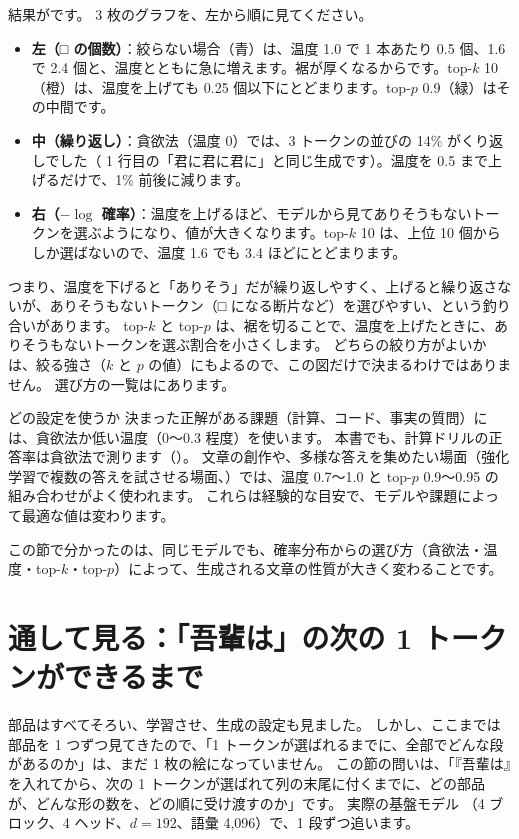 結果がです。
3 枚のグラフを、左から順に見てください。
\begin{itemize}
\item \textbf{左（□ の個数）}：絞らない場合（青）は、温度 1.0 で 1 本あたり 0.5 個、1.6 で 2.4 個と、温度とともに急に増えます。裾が厚くなるからです。top-$k$ 10（橙）は、温度を上げても 0.25 個以下にとどまります。top-$p$ 0.9（緑）はその中間です。
\item \textbf{中（繰り返し）}：貪欲法（温度 0）では、3 トークンの並びの 14\% がくり返しでした（ 1 行目の「君に君に君に」と同じ生成です）。温度を 0.5 まで上げるだけで、1\% 前後に減ります。
\item \textbf{右（$-\log$ 確率）}：温度を上げるほど、モデルから見てありそうもないトークンを選ぶようになり、値が大きくなります。top-$k$ 10 は、上位 10 個からしか選ばないので、温度 1.6 でも 3.4 ほどにとどまります。
\end{itemize}
つまり、温度を下げると「ありそう」だが繰り返しやすく、上げると繰り返さないが、ありそうもないトークン（□ になる断片など）を選びやすい、という釣り合いがあります。
top-$k$ と top-$p$ は、裾を切ることで、温度を上げたときに、ありそうもないトークンを選ぶ割合を小さくします。
どちらの絞り方がよいかは、絞る強さ（$k$ と $p$ の値）にもよるので、この図だけで決まるわけではありません。
選び方の一覧はにあります。

\begin{practice}{どの設定を使うか}
決まった正解がある課題（計算、コード、事実の質問）には、貪欲法か低い温度（0〜0.3 程度）を使います。
本書でも、計算ドリルの正答率は貪欲法で測ります（）。
文章の創作や、多様な答えを集めたい場面（強化学習で複数の答えを試させる場面、）では、温度 0.7〜1.0 と top-$p$ 0.9〜0.95 の組み合わせがよく使われます。
これらは経験的な目安で、モデルや課題によって最適な値は変わります。
\end{practice}

この節で分かったのは、同じモデルでも、確率分布からの選び方（貪欲法・温度・top-$k$・top-$p$）によって、生成される文章の性質が大きく変わることです。

\section{通して見る：「吾輩は」の次の 1 トークンができるまで}\label{sec:tf-walkthrough}

部品はすべてそろい、学習させ、生成の設定も見ました。
しかし、ここまでは部品を 1 つずつ見てきたので、「1 トークンが選ばれるまでに、全部でどんな段があるのか」は、まだ 1 枚の絵になっていません。
この節の問いは、「『吾輩は』を入れてから、次の 1 トークンが選ばれて列の末尾に付くまでに、どの部品が、どんな形の数を、どの順に受け渡すのか」です。
実際の基盤モデル （4 ブロック、4 ヘッド、$d=192$、語彙 4,096）で、1 段ずつ追います。

